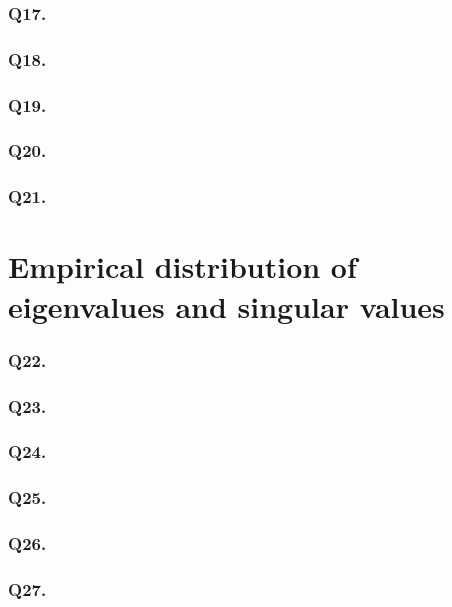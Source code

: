 \documentclass[11pt]{article}
\begin{document}
 \subsubsection{Q17. }
 
  \subsubsection{Q18. }
  
   \subsubsection{Q19. }
   
    \subsubsection{Q20. }
    
     \subsubsection{Q21. }
 
 \section{Empirical distribution of eigenvalues and singular values}
 
\subsubsection{Q22. }
 
\subsubsection{Q23. }

\subsubsection{Q24. }

\subsubsection{Q25. }

\subsubsection{Q26. }

\subsubsection{Q27. }
 
\end{document}
